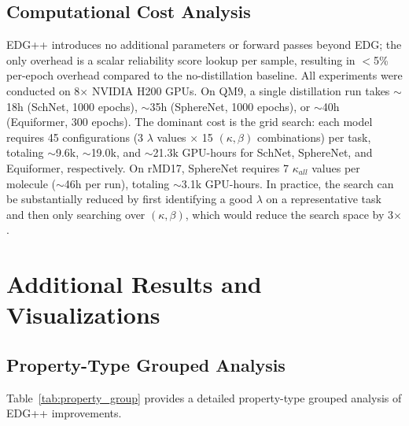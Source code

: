 \subsection{Computational Cost Analysis}
\label{sec:appendix_cost}

EDG++ introduces no additional parameters or forward passes beyond EDG; the only overhead is a scalar reliability score lookup per sample, resulting in $<$5\% per-epoch overhead compared to the no-distillation baseline. All experiments were conducted on 8$\times$ NVIDIA H200 GPUs. On QM9, a single distillation run takes $\sim$18h (SchNet, 1000 epochs), $\sim$35h (SphereNet, 1000 epochs), or $\sim$40h (Equiformer, 300 epochs). The dominant cost is the grid search: each model requires 45 configurations (3 $\lambda$ values $\times$ 15 $(\kappa, \beta)$ combinations) per task, totaling $\sim$9.6k, $\sim$19.0k, and $\sim$21.3k GPU-hours for SchNet, SphereNet, and Equiformer, respectively. On rMD17, SphereNet requires 7 $\kappa_{all}$ values per molecule ($\sim$46h per run), totaling $\sim$3.1k GPU-hours. In practice, the search can be substantially reduced by first identifying a good $\lambda$ on a representative task and then only searching over $(\kappa, \beta)$, which would reduce the search space by 3$\times$.


\section{Additional Results and Visualizations}
\label{sec:appendix_results}

\subsection{Property-Type Grouped Analysis}
\label{sec:appendix_property_group}

Table~\ref{tab:property_group} provides a detailed property-type grouped analysis of EDG++ improvements.

